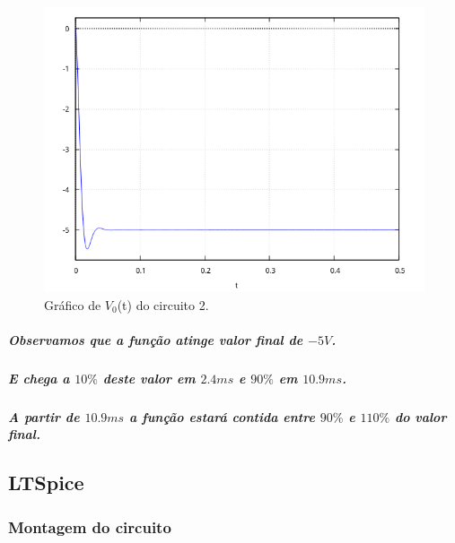 \documentclass[12pt,twoside, a4paper, twocolumn]{article}
\begin{document}
\begin{figure}[h]
    \centering
    \includegraphics[width=1\columnwidth]{images/graficoH2t.png}
    \caption{Gráfico de $V_0$(t) do circuito 2.}
\end{figure}


\subparagraph*{Observamos que a função atinge valor final de $-5V$.}


\subparagraph*{E chega a $10\%$ deste valor em $2.4ms$ e $90\%$ em $10.9ms$.}


\subparagraph*{A partir de $10.9ms$ a função estará contida entre $90\%$ e $110\%$ do valor final.}






\newpage








\subsection{LTSpice}


\subsubsection*{Montagem do circuito}
\end{document}
